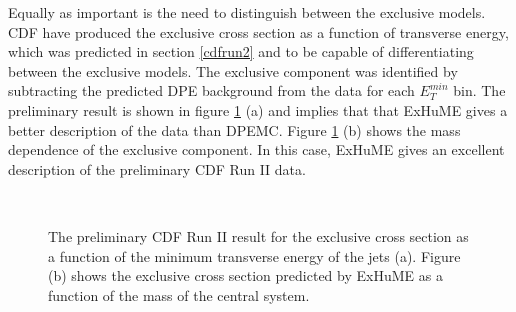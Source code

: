 Equally as important is the need to distinguish between the exclusive models. CDF have produced the exclusive cross section as a function of transverse energy, which was predicted in section \ref{cdfrun2} and \cite{Cox:2005gr} to be capable of differentiating between the exclusive models. The exclusive component was identified by subtracting the predicted DPE background from the data for each $E_T^{min}$ bin. The preliminary result is shown in figure \ref{cdfprelimexhume} (a) and implies that that ExHuME gives a better description of the data than DPEMC. Figure \ref{cdfprelimexhume} (b) shows the mass dependence of the exclusive component. In this case, ExHuME gives an excellent description of the preliminary CDF Run II data.

\begin{figure}[t]
\centering
	\mbox{
	}
\caption[The preliminary CDF Run II result for the exclusive cross section as a function of jet transverse energy and central mass]{ The preliminary \cite{dinogoulianos} CDF Run II result for the exclusive cross section as a function of the minimum transverse energy of the jets (a). Figure (b) shows the exclusive cross section predicted by ExHuME as a function of the mass of the central system. \label{cdfprelimexhume}}
\end{figure}

  